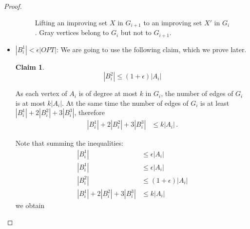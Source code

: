 \documentclass[11pt]{article}
\newtheorem{claim}[theorem]{Claim}
\theoremstyle{definition}
\begin{document}
\begin{proof}
\begin{itemize}
\begin{figure}
\begin{center}
   \end{center}
  \caption{Lifting an improving set $X$ in $G_{i+1}$ to an improving set $X'$ in $G_{i}$. Gray vertices belong to $G_i$ but not to $G_{i+1}$.}
  \label{fig1}
  \end{figure}
  \item $|B_i^1| < \epsilon |OPT|$:
  We are going to use the following claim, which we prove later.
  \begin{claim}
  \label{claim:new}
  $$|B_i^2| \le (1+\epsilon) |A_i|$$
  \end{claim}

  As each vertex of $A_i$ is of degree at most $k$ in $G_i$,
  the number of edges of $G_i$ is at most $k|A_i|$.
  At the same time the number of edges of $G_i$ is at least 
  $|B_i^1|+2|B_i^2|+3|B_i^3|$, therefore
  \begin{align*}
   |B_i^1| + 2|B_i^2| + 3|B_i^3| &\le k|A_i|\,. 
   \end{align*}

  Note that summing the inequalities:
  \begin{align*}
  |B_i^1| &\le  \epsilon |A_i| \\
  |B_i^1| &\le \epsilon |A_i| \\
  |B_i^2| &\le  (1+\epsilon) |A_i| \\
   |B_i^1| + 2|B_i^2| + 3|B_i^3| &\le k|A_i| 
   \end{align*}
   we obtain


\end{itemize}
\end{proof}
\end{document}
